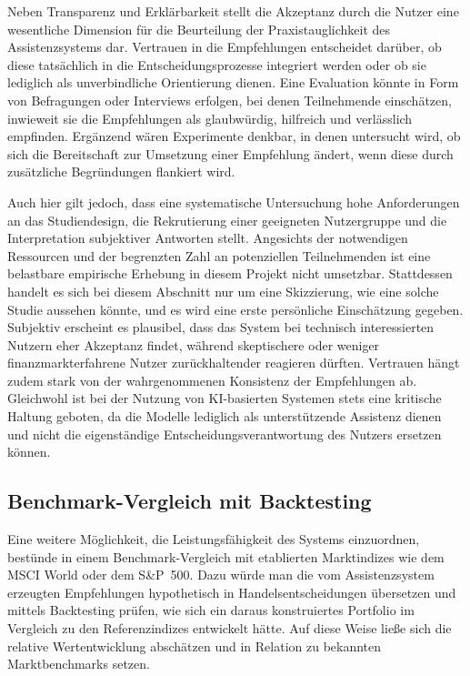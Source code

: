       Neben Transparenz und Erklärbarkeit stellt die Akzeptanz durch die Nutzer eine wesentliche Dimension für die Beurteilung der Praxistauglichkeit des Assistenzsystems dar.
      Vertrauen in die Empfehlungen entscheidet darüber, ob diese tatsächlich in die Entscheidungsprozesse integriert werden oder ob sie lediglich als unverbindliche Orientierung dienen.
      Eine Evaluation könnte in Form von Befragungen oder Interviews erfolgen, bei denen Teilnehmende einschätzen, inwieweit sie die Empfehlungen als glaubwürdig, hilfreich und verlässlich empfinden.
      Ergänzend wären Experimente denkbar, in denen untersucht wird, ob sich die Bereitschaft zur Umsetzung einer Empfehlung ändert, wenn diese durch zusätzliche Begründungen flankiert wird.

      Auch hier gilt jedoch, dass eine systematische Untersuchung hohe Anforderungen an das Studiendesign, die Rekrutierung einer geeigneten Nutzergruppe und die Interpretation subjektiver Antworten stellt.
      Angesichts der notwendigen Ressourcen und der begrenzten Zahl an potenziellen Teilnehmenden ist eine belastbare empirische Erhebung in diesem Projekt nicht umsetzbar.
      Stattdessen handelt es sich bei diesem Abschnitt nur um eine Skizzierung, wie eine solche Studie aussehen könnte, und es wird eine erste persönliche Einschätzung gegeben.
      Subjektiv erscheint es plausibel, dass das System bei technisch interessierten Nutzern eher Akzeptanz findet, während skeptischere oder weniger finanzmarkterfahrene Nutzer zurückhaltender reagieren dürften.
      Vertrauen hängt zudem stark von der wahrgenommenen Konsistenz der Empfehlungen ab.
      Gleichwohl ist bei der Nutzung von \acs{KI}-basierten Systemen stets eine kritische Haltung geboten, da die Modelle lediglich als unterstützende Assistenz dienen und nicht die eigenständige Entscheidungsverantwortung des Nutzers ersetzen können.

    \subsection{Benchmark-Vergleich mit Backtesting}

      Eine weitere Möglichkeit, die Leistungsfähigkeit des Systems einzuordnen, bestünde in einem Benchmark-Vergleich mit etablierten Marktindizes wie dem MSCI World oder dem S\&P~500.
      Dazu würde man die vom Assistenzsystem erzeugten Empfehlungen hypothetisch in Handelsentscheidungen übersetzen und mittels Backtesting prüfen, wie sich ein daraus konstruiertes Portfolio im Vergleich zu den Referenzindizes entwickelt hätte.
      Auf diese Weise ließe sich die relative Wertentwicklung abschätzen und in Relation zu bekannten Marktbenchmarks setzen.

